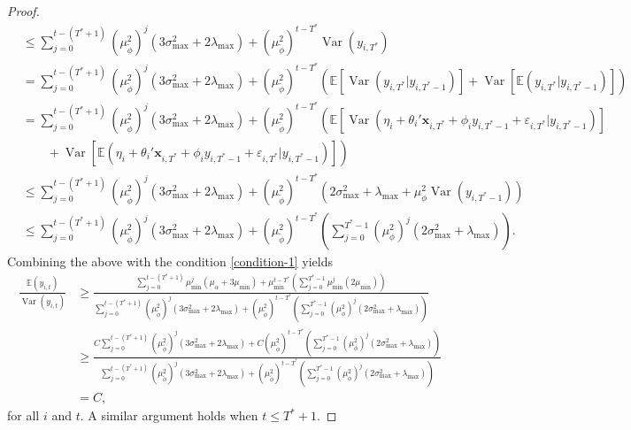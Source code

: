 \documentclass[11pt]{article}
\newcommand{\x}{\textbf{x}}
\def\E{\mathbb{E}} %
\DeclareMathOperator{\Var}{Var} %
\theoremstyle{definition}
\begin{document}
\begin{proof}
\begin{align*}
  &\leq \sum_{j=0}^{t - (T^*+1)} (\mu_{\tilde\phi}^2)^j\left(3\sigma^2_{\max} + 2\lambda_{\max}\right) + (\mu_{\tilde\phi}^2)^{t - T^*}\Var(y_{i,T^*}) \\
  &= \sum_{j=0}^{t - (T^*+1)} (\mu_{\tilde\phi}^2)^j\left(3\sigma^2_{\max} + 2\lambda_{\max}\right) + (\mu_{\tilde\phi}^2)^{t - T^*}\left(\E\left[\Var(y_{i,T^*}|y_{i,T^*-1})\right] + \Var\left[\E(y_{i,T^*}|y_{i,T^*-1})\right]\right) \\
  &= \sum_{j=0}^{t - (T^*+1)} (\mu_{\tilde\phi}^2)^j\left(3\sigma^2_{\max} + 2\lambda_{\max}\right) + (\mu_{\tilde\phi}^2)^{t - T^*}\left(\E\left[\Var(\eta_i + \theta_i'\x_{i,T^*} + \phi_iy_{i,T^*-1} + \varepsilon_{i,T^*}|y_{i,T^*-1})\right] \right. \\ 
  &\qquad+  \left.\Var\left[\E(\eta_i + \theta_i'\x_{i,T^*} + \phi_iy_{i,T^*-1} + \varepsilon_{i,T^*}|y_{i,T^*-1})\right]\right)  \\
  &\leq \sum_{j=0}^{t - (T^*+1)} (\mu_{\tilde\phi}^2)^j\left(3\sigma^2_{\max} + 2\lambda_{\max}\right) + (\mu_{\tilde\phi}^2)^{t - T^*}\left(2\sigma^2_{\max} + \lambda_{\max} + \mu_{\phi}^2\Var(y_{i,T^*-1}) \right) \\ 
  &\leq \sum_{j=0}^{t - (T^*+1)} (\mu_{\tilde\phi}^2)^j\left(3\sigma^2_{\max} + 2\lambda_{\max}\right) + (\mu_{\tilde\phi}^2)^{t - T^*}\left(\sum_{j=0}^{T^*-1}\left(\mu_{\phi}^2\right)^{j}(2\sigma^2_{\max} + \lambda_{\max})\right).  
\end{align*}
Combining the above with the condition \eqref{condition-1} yields 
\begin{align*}
  \frac{\E(y_{i,t})}{\Var(y_{i,t})} &\geq \frac{\sum_{j=0}^{t - (T^* + 1)} \mu_{\min}^j(\mu_{\alpha} + 3\mu_{\min}) + \mu_{\min}^{t-T^*}\left(\sum_{j=0}^{T^*-1}\mu_{\min}^j(2\mu_{\min}) \right)}{\sum_{j=0}^{t - (T^*+1)} (\mu_{\tilde\phi}^2)^j\left(3\sigma^2_{\max} + 2\lambda_{\max}\right) + (\mu_{\tilde\phi}^2)^{t - T^*}\left(\sum_{j=0}^{T^*-1}\left(\mu_{\phi}^2\right)^{j}(2\sigma^2_{\max} + \lambda_{\max})\right)} \\
  &\geq \frac{C\sum_{j=0}^{t - (T^*+1)} (\mu_{\tilde\phi}^2)^j\left(3\sigma^2_{\max} + 2\lambda_{\max}\right) + C(\mu_{\tilde\phi}^2)^{t - T^*}\left(\sum_{j=0}^{T^*-1}\left(\mu_{\phi}^2\right)^{j}(2\sigma^2_{\max} + \lambda_{\max})\right)}{\sum_{j=0}^{t - (T^*+1)} (\mu_{\tilde\phi}^2)^j\left(3\sigma^2_{\max} + 2\lambda_{\max}\right) + (\mu_{\tilde\phi}^2)^{t - T^*}\left(\sum_{j=0}^{T^*-1}\left(\mu_{\phi}^2\right)^{j}(2\sigma^2_{\max} + \lambda_{\max})\right)} \\
  &= C,
\end{align*}
for all $i$ and $t$. A similar argument holds when $t \leq T^* + 1$.
\end{proof}
\end{document}
